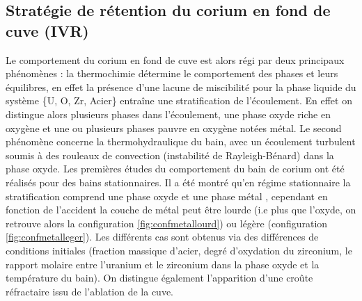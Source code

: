 \subsection{Stratégie de rétention du corium en fond de cuve (IVR)}
Le comportement du corium en fond de cuve est alors régi par deux principaux phénomènes \cite{shams_status_2020} : 
la thermochimie détermine le comportement des phases et leurs équilibres, en effet la présence d'une lacune de miscibilité pour la phase liquide du système \{U, O, Zr, Acier\} entraîne une stratification de l'écoulement. En effet on distingue alors plusieurs phases dans l'écoulement, une phase oxyde riche en oxygène et une ou plusieurs phases pauvre en oxygène notées métal. Le second phénomène concerne la thermohydraulique du bain, avec un écoulement turbulent soumis à des rouleaux de convection (instabilité de Rayleigh-Bénard) dans la phase oxyde.
Les premières études du comportement du bain de corium ont été réalisés pour des bains stationnaires. Il a été montré qu'en régime stationnaire la stratification comprend une phase oxyde et une phase métal \cite{theofanous_-vessel_1997}, cependant en fonction de l'accident la couche de métal peut être lourde (i.e plus que l'oxyde, on retrouve alors la configuration \ref{fig:confmetallourd}) ou légère (configuration \ref{fig:confmetalleger}). Les différents cas sont obtenus via des différences de conditions initiales (fraction massique d'acier, degré d'oxydation du zirconium, le rapport molaire entre l'uranium et le zirconium dans la phase oxyde et la température du bain). On distingue également l'apparition d'une croûte réfractaire issu de l'ablation de la cuve.
